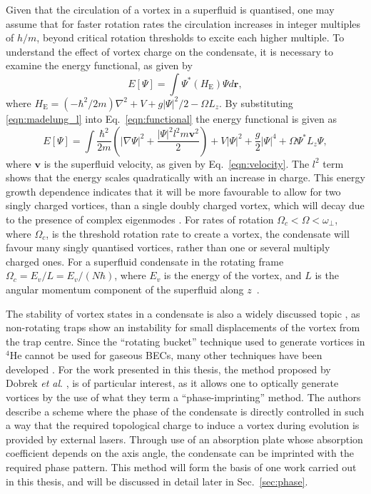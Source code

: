 Given that the circulation of a vortex in a superfluid is quantised, one may assume that for faster rotation rates the circulation increases in integer multiples of $h/m$, beyond critical rotation thresholds to excite each higher multiple. To understand the effect of vortex charge on the condensate, it is necessary to examine the energy functional, as given by
    \begin{equation}\label{eqn:functional}
        E[\Psi] = \int \Psi^{*} (H_{\text{E}}) \Psi d\mathbf{r},
    \end{equation}
where $H_{\text{E}} = (-\hbar^2/2m)\nabla^2 + V + g|\Psi|^2/2 - \Omega L_z$. By substituting \eqref{eqn:madelung_l} into Eq.~\eqref{eqn:functional} the energy functional is given as
\begin{equation}\label{eqn:functional_full}
    E[\Psi] = \int \frac{\hbar^2}{2m} \left(|\nabla\Psi|^2  + \frac{|\Psi|^2 l^2 m \mathbf{v}^2}{2}  \right) + V|\Psi|^2 + \frac{g}{2}|\Psi|^4 + \Omega \Psi^{*} L_z \Psi,
\end{equation}
where $\mathbf{v}$ is the superfluid velocity, as given by Eq.~\eqref{eqn:velocity}. The $l^2$ term shows that the energy scales quadratically with an increase in charge. This energy growth dependence indicates that it will be more favourable to allow for two singly charged vortices, than a single doubly charged vortex, which will decay due to the presence of complex eigenmodes \cite{VTX:Kawaguchi_pra_2004}. For rates of rotation $\Omega_c < \Omega < \omega_\perp$, where $\Omega_c$, is the threshold rotation rate to create a vortex, the condensate will favour many singly quantised vortices, rather than one or several multiply charged ones. For a superfluid condensate in the rotating frame $\Omega_c = {E_v/L} = {E_v/(N\hbar)}$, where $E_v$ is the energy of the vortex, and $L$ is the angular momentum component of the superfluid along $z$~\cite{BK:Pitaevskii_Stringari_2003}.

The stability of vortex states in a condensate is also a widely discussed topic \cite{Vtx:Fedichev_pra_1999,Vtx:Feder_prl_1999}, as non-rotating traps show an instability for small displacements of the vortex from the trap centre. Since the ``rotating bucket'' technique used to generate vortices in $^4$He cannot be used for gaseous BECs, many other techniques have been developed \cite{Vtx:Anglin_prl_1999,Vtx:Davies_prl_1999,Vtx:Marshall_pra_1999,Vtx:Dobrek_pra_1999,VTX:Nakahara_physb_2000}. For the work presented in this thesis, the method proposed by Dobrek \textit{et al}. \cite{Vtx:Dobrek_pra_1999}, is of particular interest, as it allows one to optically generate vortices by the use of what they term a ``phase-imprinting'' method. The authors describe a scheme where the phase of the condensate is directly controlled in such a way that the required topological charge to induce a vortex during evolution is provided by external lasers. Through use of an absorption plate whose absorption coefficient depends on the axis angle, the condensate can be imprinted with the required phase pattern. This method will form the basis of one work carried out in this thesis, and will be discussed in detail later in Sec.~\ref{sec:phase}.


